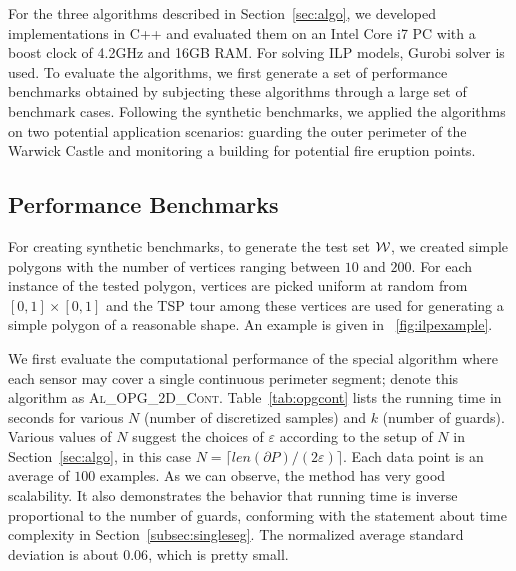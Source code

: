 For the three algorithms described in Section~\ref{sec:algo}, we developed
implementations in C++ and evaluated them on an Intel Core i7 PC with a 
boost clock of 4.2GHz and 16GB RAM. For solving ILP models, 
Gurobi solver \cite{optimization2019gurobi} is used. 
%
To evaluate the algorithms, we first generate a set of performance 
benchmarks obtained by subjecting these algorithms through a large set 
of benchmark cases. 
%
Following the synthetic benchmarks, we applied the algorithms on two 
potential application scenarios: guarding the outer perimeter of the 
Warwick Castle and monitoring a building for potential fire eruption 
points.
 
\subsection{Performance Benchmarks}
For creating synthetic benchmarks, to generate the test set $\mathcal W$, we 
created simple polygons with the number of vertices ranging between 
$10$ and $200$. 
%
For each instance of the tested polygon, vertices are picked uniform at 
random from $[0,1]\times[0,1]$ and the TSP tour among these vertices are 
used for generating a simple polygon of a reasonable shape.
%
An example is given in ~\ref{fig:ilpexample}.

\def\opgtc{\textsc{Al\_OPG\_2D\_Cont}\xspace}
\def\opgtilp{\textsc{Al\_OPG\_2D\_ILP}\xspace}
\def\orgtilp{\textsc{Al\_ORG\_2D\_ILP}\xspace}
We first evaluate the computational performance of the special \opgt
algorithm where each sensor may cover a single continuous perimeter
segment; denote this algorithm as \opgtc.
%
Table~\ref{tab:opgcont} lists the running time in seconds for 
various $N$ (number of discretized samples) and $k$ (number of guards). 
Various values of $N$ suggest the choices of $\varepsilon$ according to 
the setup of $N$ in Section~\ref{sec:algo}, in this case 
$N=\lceil {len(\partial P)}/{(2\varepsilon)} \rceil$.
Each data point is an average of $100$ examples. As we can observe, the 
method has very good scalability. It also demonstrates the behavior that 
running time is inverse proportional to the number of guards, 
conforming with the statement about time complexity in Section~\ref{subsec:singleseg}. 
The normalized 
average standard deviation is about $0.06$, which is pretty small. 

